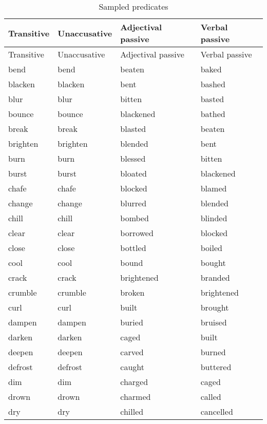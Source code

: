 \documentclass[output=paper]{langsci/langscibook}
\begin{document}
\label{app-14:a}
{\small
\begin{longtable}{ *{4}{>{\raggedright\arraybackslash}p{}} }
\caption{Sampled predicates}\\
\lsptoprule Transitive  & Unaccusative & Adjectival passive & Verbal passive\\\midrule\endfirsthead
\midrule Transitive  & Unaccusative & Adjectival passive & Verbal passive\\\midrule\endhead
\endfoot\lspbottomrule\endlastfoot
bend      & bend      & beaten     & baked\\
blacken   & blacken   & bent       & bashed\\
blur      & blur      & bitten     & basted\\
bounce    & bounce    & blackened  & bathed\\
break     & break     & blasted    & beaten\\
brighten  & brighten  & blended    & bent\\
burn      & burn      & blessed    & bitten \\
burst     & burst     & bloated    & blackened\\
chafe     & chafe     & blocked    & blamed\\
change    & change    & blurred    & blended\\
chill     & chill     & bombed     & blinded\\
clear     & clear     & borrowed   & blocked\\
close     & close     & bottled    & boiled\\
cool      & cool      & bound      & bought\\
crack     & crack     & brightened & branded\\
crumble   & crumble   & broken     & brightened\\
curl      & curl      & built      & brought\\
dampen    & dampen    & buried     & bruised\\
darken    & darken    & caged      & built \\
deepen    & deepen    & carved     & burned\\
defrost   & defrost   & caught     & buttered\\
dim       & dim       & charged    & caged\\
drown     & drown     & charmed    & called\\
dry       & dry       & chilled    & cancelled \\

\end{longtable}}
\end{document}
